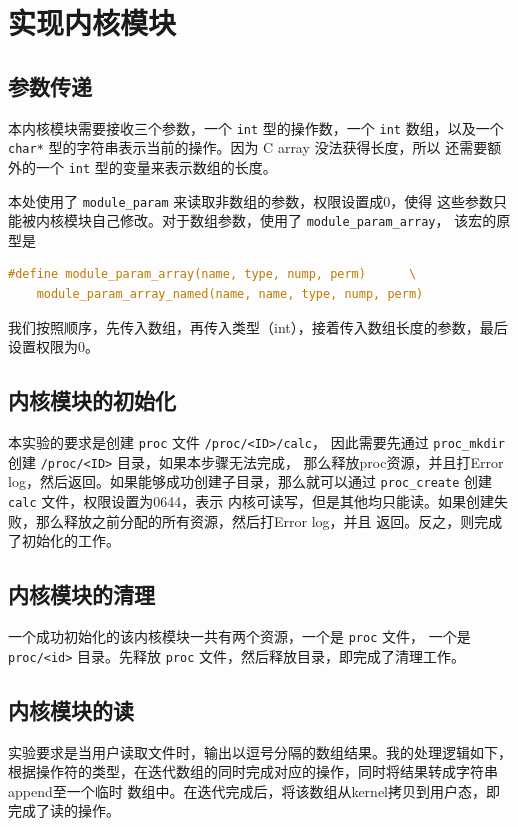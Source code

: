 \section{实现内核模块}
\subsection{参数传递}
本内核模块需要接收三个参数，一个 \texttt{int} 型的操作数，一个 \texttt{int} 数组，以及一个
\texttt{char*} 型的字符串表示当前的操作。因为 C array 没法获得长度，所以
还需要额外的一个 \texttt{int} 型的变量来表示数组的长度。

本处使用了 \texttt{module_param} 来读取非数组的参数，权限设置成0，使得
这些参数只能被内核模块自己修改。对于数组参数，使用了 \texttt{module_param_array}，
该宏的原型是
\begin{lstlisting}[language=C]
#define module_param_array(name, type, nump, perm)		\
	module_param_array_named(name, name, type, nump, perm)

\end{lstlisting}

我们按照顺序，先传入数组，再传入类型（int），接着传入数组长度的参数，最后设置权限为0。

\subsection{内核模块的初始化}
本实验的要求是创建 \texttt{proc} 文件 \texttt{/proc/<ID>/calc}，
因此需要先通过 \texttt{proc\_mkdir} 创建 \texttt{/proc/<ID>} 目录，如果本步骤无法完成，
那么释放proc资源，并且打Error log，然后返回。如果能够成功创建子目录，那么就可以通过
\texttt{proc_create} 创建 \texttt{calc} 文件，权限设置为0644，表示
内核可读写，但是其他均只能读。如果创建失败，那么释放之前分配的所有资源，然后打Error log，并且
返回。反之，则完成了初始化的工作。

\subsection{内核模块的清理}
一个成功初始化的该内核模块一共有两个资源，一个是 \texttt{proc} 文件，
一个是 \texttt{proc/<id>} 目录。先释放 \texttt{proc} 文件，然后释放目录，即完成了清理工作。

\subsection{内核模块的读}
实验要求是当用户读取文件时，输出以逗号分隔的数组结果。我的处理逻辑如下，
根据操作符的类型，在迭代数组的同时完成对应的操作，同时将结果转成字符串append至一个临时
数组中。在迭代完成后，将该数组从kernel拷贝到用户态，即完成了读的操作。

